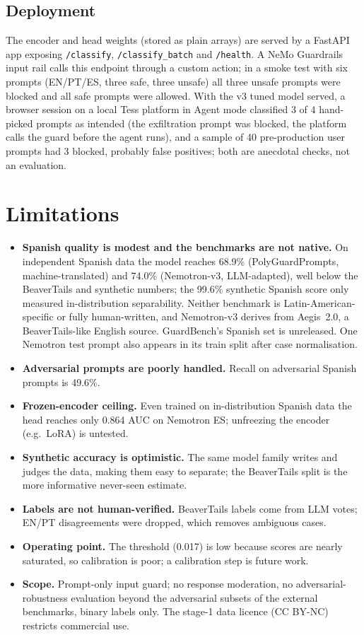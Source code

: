 \documentclass[conference]{IEEEtran}
\begin{document}
\subsection{Deployment}
The encoder and head weights (stored as plain arrays) are served by a FastAPI app exposing \texttt{/classify}, \texttt{/classify\_batch} and \texttt{/health}. A NeMo Guardrails~\cite{rebedea2023nemoguardrails} input rail calls this endpoint through a custom action; in a smoke test with six prompts (EN/PT/ES, three safe, three unsafe) all three unsafe prompts were blocked and all safe prompts were allowed. With the v3 tuned model served, a browser session on a local Tess platform in Agent mode classified 3 of 4 hand-picked prompts as intended (the exfiltration prompt was blocked, the platform calls the guard before the agent runs), and a sample of 40 pre-production user prompts had 3 blocked, probably false positives; both are anecdotal checks, not an evaluation.

\section{Limitations}
\begin{itemize}
\item \textbf{Spanish quality is modest and the benchmarks are not native.} On independent Spanish data the model reaches 68.9\% (PolyGuardPrompts, machine-translated) and 74.0\% (Nemotron-v3, LLM-adapted), well below the BeaverTails and synthetic numbers; the 99.6\% synthetic Spanish score only measured in-distribution separability. Neither benchmark is Latin-American-specific or fully human-written, and Nemotron-v3 derives from Aegis~2.0, a BeaverTails-like English source. GuardBench's Spanish set is unreleased. One Nemotron test prompt also appears in its train split after case normalisation.
\item \textbf{Adversarial prompts are poorly handled.} Recall on adversarial Spanish prompts is 49.6\%.
\item \textbf{Frozen-encoder ceiling.} Even trained on in-distribution Spanish data the head reaches only 0.864 AUC on Nemotron ES; unfreezing the encoder (e.g.\ LoRA) is untested.
\item \textbf{Synthetic accuracy is optimistic.} The same model family writes and judges the data, making them easy to separate; the BeaverTails split is the more informative never-seen estimate.
\item \textbf{Labels are not human-verified.} BeaverTails labels come from LLM votes; EN/PT disagreements were dropped, which removes ambiguous cases.
\item \textbf{Operating point.} The threshold (0.017) is low because scores are nearly saturated, so calibration is poor; a calibration step is future work.
\item \textbf{Scope.} Prompt-only input guard; no response moderation, no adversarial-robustness evaluation beyond the adversarial subsets of the external benchmarks, binary labels only. The stage-1 data licence (CC BY-NC) restricts commercial use.
\end{itemize}
\end{document}
